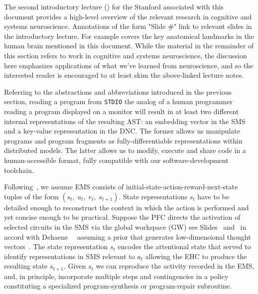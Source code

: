 The second introductory lecture ({}) for the Stanford {} associated with this document provides a high-level overview of the relevant research in cognitive and systems neuroscience. Annotations of the form "Slide \#" link to relevant slides in the introductory lecture. For example {{}} covers the key anatomical landmarks in the human brain mentioned in this document. While the material in the remainder of this section refers to work in cognitive and systems neuroscience, the discussion here emphasizes applications of what we've learned from neuroscience, and so the interested reader is encouraged to at least skim the above-linked lecture notes.


Referring to the abstractions and abbreviations introduced in the previous section, reading a program from {\tt{STDIO}} \emdash{} the analog of a human programmer reading a program displayed on a monitor \emdash{} will result in \emdash{} at least \emdash{} two different internal representations of the resulting AST: an embedding vector in the SMS and a key-value representation in the DNC. The former allows us manipulate programs and program fragments as fully-differentiable representations within distributed models. The latter allows us to modify, execute and share code in a human-accessible format, fully compatible with our software-development toolchain.

Following~\cite{PritzeletalICML-17}, we assume EMS consists of initial-state-action-reward-next-state tuples of the form $(s_{t},\;a_{t},\;r_{t},\;s_{t+1})$. State representations $s_{t}$ have to be detailed enough to reconstruct the context in which the action is performed and yet concise enough to be practical. Suppose the PFC directs the activation of selected circuits in the SMS via the global workspace (GW) \emdash{} see Slides~{{}} and~{{}} \emdash{} in accord with Dehaene~\etal{}~\cite{DehaeneetalSCIENCE-17,Dehaene2014} assuming a prior that generates low-dimensional thought vectors~\cite{BengioCoRR-17}. The state representation $s_{t}$ encodes the attentional state that served to identify representations in SMS relevant to $a_{t}$ allowing the EHC to produce the resulting state $s_{t+1}$. Given $s_{t}$ we can reproduce the activity recorded in the EMS, and, in principle, incorporate multiple steps and contingencies in a policy constituting a specialized program-synthesis or program-repair subroutine.

